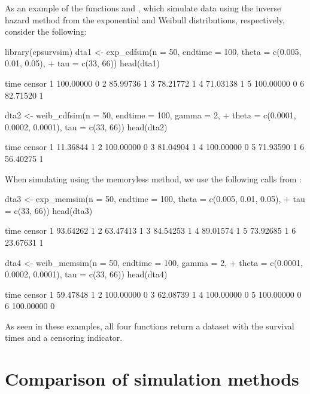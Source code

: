 As an example of the functions  and , which simulate data using the inverse hazard method from the exponential and Weibull distributions, respectively, consider the following:
%
\begin{example}
library(cpsurvsim)
dta1 <- exp_cdfsim(n = 50, endtime = 100, theta = c(0.005, 0.01, 0.05), 
+  tau = c(33, 66))
head(dta1)

       time censor
1 100.00000      0
2  85.99736      1
3  78.21772      1
4  71.03138      1
5 100.00000      0
6  82.71520      1

dta2 <- weib_cdfsim(n = 50, endtime = 100, gamma = 2, 
+  theta = c(0.0001, 0.0002, 0.0001), tau = c(33, 66))
head(dta2)

       time censor
1  11.36844      1
2 100.00000      0
3  81.04904      1
4 100.00000      0
5  71.93590      1
6  56.40275      1
\end{example}
%
When simulating using the memoryless method, we use the following calls from :
%
\begin{example}
dta3 <- exp_memsim(n = 50, endtime = 100, theta = c(0.005, 0.01, 0.05), 
+  tau = c(33, 66))
head(dta3)

      time censor
1 93.64262      1
2 63.47413      1
3 84.54253      1
4 89.01574      1
5 73.92685      1
6 23.67631      1     

dta4 <- weib_memsim(n = 50, endtime = 100, gamma = 2, 
+  theta = c(0.0001, 0.0002, 0.0001), tau = c(33, 66))
head(dta4)

       time censor
1  59.47848      1
2 100.00000      0
3  62.08739      1
4 100.00000      0
5 100.00000      0
6 100.00000      0
\end{example}
%
As seen in these examples, all four functions return a dataset with the survival times and a censoring indicator. 

\section{Comparison of simulation methods}

